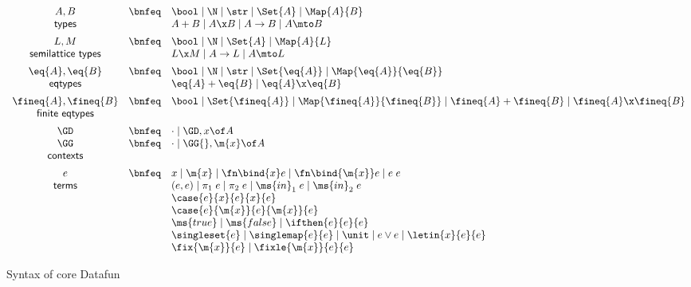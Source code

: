 \begin{figure}
  \[\begin{array}{ccl}
    A, B     &\bnfeq& \bool \pipe \N \pipe \str \pipe \Set{A}
                      \pipe \Map{A}{B}
    \\
    \textsf{types} && A + B \pipe A \x B \pipe A \uto B \pipe A \mto B
    \vspace{0.5em}\\
    L, M         &\bnfeq& \bool \pipe \N \pipe \Set{A} \pipe \Map{A}{L}
    \\
    \textsf{semilattice types} && L \x M \pipe A \uto L \pipe A \mto L
    \vspace{0.5em}\\
    \eq{A}, \eq{B} &\bnfeq& \bool \pipe \N \pipe \str \pipe \Set{\eq{A}}
                            \pipe \Map{\eq{A}}{\eq{B}}
    \\
    \textsf{eqtypes} && \eq{A} + \eq{B} \pipe \eq{A} \x \eq{B}
    \vspace{0.5em}\\
    \fineq{A},\fineq{B}
    &\bnfeq& \bool \pipe \Set{\fineq{A}}
       \pipe \Map{\fineq{A}}{\fineq{B}}
       \pipe \fineq{A} + \fineq{B} \pipe \fineq{A} \x \fineq{B}\\
    \textsf{finite eqtypes}
    \vspace{0.5em}\\
    \GD &\bnfeq& \cdot \pipe \GD, x\of A\\
    \GG &\bnfeq& \cdot \pipe \GG{},\m{x}\of A\\
    \textsf{contexts}
    \vspace{0.5em}\\
    e &\bnfeq& x \pipe \m{x} \pipe \fn\bind{x} e \pipe \fn\bind{\m{x}} e
    \pipe e\;e\\
    \textsf{terms}
    && (e,e) \pipe \pi_1\;e \pipe \pi_2\;e
    \pipe \ms{in}_1\;e \pipe \ms{in}_2\;e\\
    && \case{e}{x}{e}{x}{e}\\
    && \case{e}{\m{x}}{e}{\m{x}}{e}\\
    && \ms{true} \pipe \ms{false} \pipe \ifthen{e}{e}{e}\\
    && \singleset{e} \pipe \singlemap{e}{e}
       \pipe \unit \pipe e \vee e \pipe \letin{x}{e}{e}\\
    && \fix{\m{x}}{e} \pipe \fixle{\m{x}}{e}{e}
  \end{array}\]
  \caption{Syntax of core Datafun}
  \label{fig:syntax}
\end{figure}

